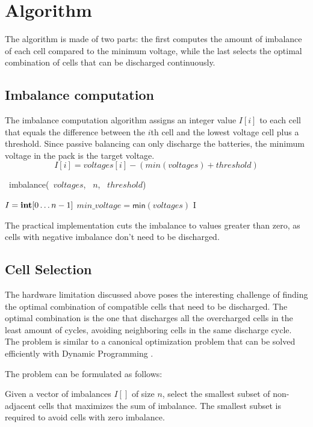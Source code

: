 \section{Algorithm}

The algorithm is made of two parts: the first computes the amount of imbalance of each cell compared to the minimum voltage, while the last selects the optimal combination of cells that can be discharged continuously.

\subsection{Imbalance computation}

The imbalance computation algorithm assigns an integer value $I[i]$ to each cell that equals the difference between the $i$th cell and the lowest voltage cell plus a threshold. Since passive balancing can only discharge the batteries, the minimum voltage in the pack is the target voltage.
\[
    I[i] = voltages[i] - (min(voltages) + threshold)
\]

\begin{algorithm}[H]
    \DontPrintSemicolon
    \NoCaptionOfAlgo
    \caption[imbalance]{\INTARRAY\ \textsf{imbalance}(\INTARRAY\ $voltages$, \INTEGER\ $n$, \INTEGER\ $threshold$)}\label{algorithm:imbalance}

    $I = \INTEGER[0 \ldots n-1]$\;
    $min\_voltage=\textsf{min}(voltages)$\;
    \Return I\;
\end{algorithm}
The practical implementation cuts the imbalance to values greater than zero, as cells with negative imbalance don't need to be discharged.

\subsection{Cell Selection}
The hardware limitation discussed above poses the interesting challenge of finding the optimal combination of compatible cells that need to be discharged. The optimal combination is the one that discharges all the overcharged cells in the least amount of cycles, avoiding neighboring cells in the same discharge cycle. The problem is similar to a canonical optimization problem that can be solved efficiently with Dynamic Programming \cite{montresor}.

The problem can be formulated as follows:

Given a vector of imbalances $I[]$ of size $n$, select the smallest subset of non-adjacent cells that maximizes the sum of imbalance. The smallest subset is required to avoid cells with zero imbalance.

